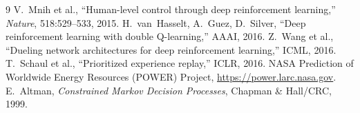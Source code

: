 ﻿\documentclass[10pt,twocolumn]{article}
\begin{document}
{\scriptsize
\begin{thebibliography}{9}\setlength{\itemsep}{0pt}\setlength{\parsep}{0pt}
 V.~Mnih et al., ``Human-level control through deep reinforcement learning,'' \emph{Nature}, 518:529--533, 2015.
 H.~van~Hasselt, A.~Guez, D.~Silver, ``Deep reinforcement learning with double Q-learning,'' AAAI, 2016.
 Z.~Wang et al., ``Dueling network architectures for deep reinforcement learning,'' ICML, 2016.
 T.~Schaul et al., ``Prioritized experience replay,'' ICLR, 2016.
 NASA Prediction of Worldwide Energy Resources (POWER) Project, \url{https://power.larc.nasa.gov}.
 E.~Altman, \emph{Constrained Markov Decision Processes}, Chapman \& Hall/CRC, 1999.
\end{thebibliography}}
\end{document}

